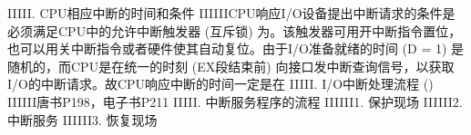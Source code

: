 \markdownRendererCircumflex{}\markdownRendererCircumflex{}I\markdownRendererCircumflex{}\markdownRendererCircumflex{}I\markdownRendererCircumflex{}\markdownRendererCircumflex{}I\markdownRendererCircumflex{}\markdownRendererCircumflex{}I\markdownRendererCircumflex{}\markdownRendererCircumflex{}I\markdownRendererHash{}. CPU相应中断的时间和条件 \markdownRendererCircumflex{}\markdownRendererCircumflex{}I\markdownRendererCircumflex{}\markdownRendererCircumflex{}I\markdownRendererCircumflex{}\markdownRendererCircumflex{}I\markdownRendererCircumflex{}\markdownRendererCircumflex{}I\markdownRendererCircumflex{}\markdownRendererCircumflex{}I\markdownRendererCircumflex{}\markdownRendererCircumflex{}ICPU响应I/O设备提出中断请求的条件是必须满足CPU中的允许中断触发器 (互斥锁) 为。该触发器可用开中断指令置位，也可以用关中断指令或者硬件使其自动复位。由于I/O准备就绪的时间 (D = 1) 是随机的，而CPU是在统一的时刻 (EX段结束前) 向接口发中断查询信号，以获取I/O的中断请求。故CPU响应中断的时间一定是在 \markdownRendererCircumflex{}\markdownRendererCircumflex{}I\markdownRendererCircumflex{}\markdownRendererCircumflex{}I\markdownRendererCircumflex{}\markdownRendererCircumflex{}I\markdownRendererCircumflex{}\markdownRendererCircumflex{}I\markdownRendererCircumflex{}\markdownRendererCircumflex{}I\markdownRendererHash{}. I/O中断处理流程 () \markdownRendererCircumflex{}\markdownRendererCircumflex{}I\markdownRendererCircumflex{}\markdownRendererCircumflex{}I\markdownRendererCircumflex{}\markdownRendererCircumflex{}I\markdownRendererCircumflex{}\markdownRendererCircumflex{}I\markdownRendererCircumflex{}\markdownRendererCircumflex{}I\markdownRendererCircumflex{}\markdownRendererCircumflex{}I唐书P198，电子书P211 \markdownRendererCircumflex{}\markdownRendererCircumflex{}I\markdownRendererCircumflex{}\markdownRendererCircumflex{}I\markdownRendererCircumflex{}\markdownRendererCircumflex{}I\markdownRendererCircumflex{}\markdownRendererCircumflex{}I\markdownRendererCircumflex{}\markdownRendererCircumflex{}I\markdownRendererHash{}. 中断服务程序的流程 \markdownRendererCircumflex{}\markdownRendererCircumflex{}I\markdownRendererCircumflex{}\markdownRendererCircumflex{}I\markdownRendererCircumflex{}\markdownRendererCircumflex{}I\markdownRendererCircumflex{}\markdownRendererCircumflex{}I\markdownRendererCircumflex{}\markdownRendererCircumflex{}I\markdownRendererCircumflex{}\markdownRendererCircumflex{}I1. 保护现场 \markdownRendererCircumflex{}\markdownRendererCircumflex{}I\markdownRendererCircumflex{}\markdownRendererCircumflex{}I\markdownRendererCircumflex{}\markdownRendererCircumflex{}I\markdownRendererCircumflex{}\markdownRendererCircumflex{}I\markdownRendererCircumflex{}\markdownRendererCircumflex{}I\markdownRendererCircumflex{}\markdownRendererCircumflex{}I2. 中断服务 \markdownRendererCircumflex{}\markdownRendererCircumflex{}I\markdownRendererCircumflex{}\markdownRendererCircumflex{}I\markdownRendererCircumflex{}\markdownRendererCircumflex{}I\markdownRendererCircumflex{}\markdownRendererCircumflex{}I\markdownRendererCircumflex{}\markdownRendererCircumflex{}I\markdownRendererCircumflex{}\markdownRendererCircumflex{}I3. 恢复现场 